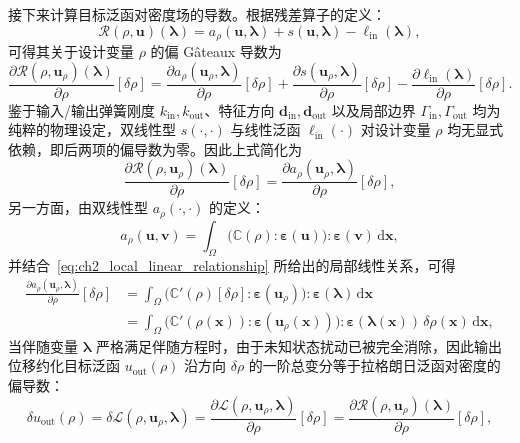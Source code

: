 接下来计算目标泛函对密度场的导数。根据残差算子的定义：
\[
\mathcal{R}(\rho,\boldsymbol{u})(\boldsymbol{\lambda}) = a_\rho(\boldsymbol{u},\boldsymbol{\lambda}) + s(\boldsymbol{u},\boldsymbol{\lambda}) - \ell_{\mathrm{in}}(\boldsymbol{\lambda}),
\]
可得其关于设计变量 $\rho$ 的偏 Gâteaux 导数为
\[
\frac{\partial\mathcal{R}(\rho,\boldsymbol{u}_\rho)(\boldsymbol{\lambda})}{\partial\rho}[\delta\rho] = \frac{\partial a_\rho(\boldsymbol{u}_\rho,\boldsymbol{\lambda})}{\partial\rho}[\delta\rho] + \frac{\partial s(\boldsymbol{u}_\rho,\boldsymbol{\lambda})}{\partial\rho}[\delta\rho] - \frac{\partial\ell_{\mathrm{in}}(\boldsymbol{\lambda})}{\partial\rho}[\delta\rho].
\]
鉴于输入/输出弹簧刚度 $k_{\mathrm{in}}, k_{\mathrm{out}}$、特征方向 $\boldsymbol{d}_{\mathrm{in}}, \boldsymbol{d}_{\mathrm{out}}$ 以及局部边界 $\Gamma_{\mathrm{in}}, \Gamma_{\mathrm{out}}$ 均为纯粹的物理设定，双线性型 $s(\cdot, \cdot)$ 与线性泛函 $\ell_{\mathrm{in}}(\cdot)$ 对设计变量 $\rho$ 均无显式依赖，即后两项的偏导数为零。因此上式简化为
\[
\frac{\partial\mathcal{R}(\rho,\boldsymbol{u}_\rho)(\boldsymbol{\lambda})}{\partial\rho}[\delta\rho] = \frac{\partial a_\rho(\boldsymbol{u}_\rho,\boldsymbol{\lambda})}{\partial\rho}[\delta\rho],
\]
另一方面，由双线性型 $a_\rho(\cdot,\cdot)$ 的定义：
\[
a_\rho(\boldsymbol{u},\boldsymbol{v}) = \int_{\Omega}\big(\mathbb{C}(\rho):\boldsymbol{\varepsilon}(\boldsymbol{u})\big) :\boldsymbol{\varepsilon}(\boldsymbol{v})\,\mathrm{d}\boldsymbol{x},
\]
并结合~\eqref{eq:ch2_local_linear_relationship} 所给出的局部线性关系，可得
\[
\begin{aligned} 
	\frac{\partial a_\rho(\boldsymbol{u}_\rho,\boldsymbol{\lambda})}{\partial\rho}[\delta\rho] &= \int_{\Omega} \big(\mathbb{C}'(\rho)[\delta\rho]:\boldsymbol{\varepsilon}(\boldsymbol{u}_\rho)\big) :\boldsymbol{\varepsilon}(\boldsymbol{\lambda})\,\mathrm{d}\boldsymbol{x}\\ &= \int_{\Omega} \big(\mathbb{C}'(\rho(\boldsymbol{x})):\boldsymbol{\varepsilon}(\boldsymbol{u}_\rho(\boldsymbol{x}))\big) : \boldsymbol{\varepsilon}(\boldsymbol{\lambda}(\boldsymbol{x}))\, \delta\rho(\boldsymbol{x})\,\mathrm{d}\boldsymbol{x}, 
\end{aligned}
\]
当伴随变量 $\boldsymbol{\lambda}$ 严格满足伴随方程时，由于未知状态扰动已被完全消除，因此输出位移约化目标泛函 $u_{\mathrm{out}}(\rho)$ 沿方向 $\delta\rho$ 的一阶总变分等于拉格朗日泛函对密度的偏导数：
\[
\delta u_{\mathrm{out}}(\rho) = \delta\mathcal{L}(\rho,\boldsymbol{u}_\rho,\boldsymbol{\lambda}) = \frac{\partial\mathcal{L}(\rho,\boldsymbol{u}_\rho,\boldsymbol{\lambda})}{\partial\rho}[\delta\rho] = \frac{\partial\mathcal{R}(\rho,\boldsymbol{u}_\rho)(\boldsymbol{\lambda})}{\partial\rho}[\delta\rho],
\]
